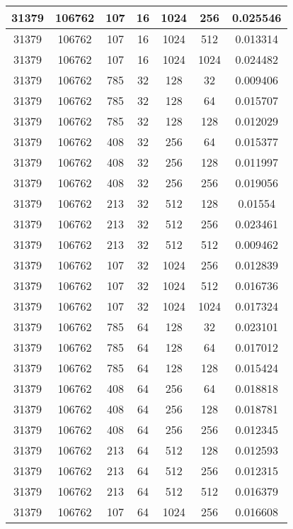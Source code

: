 \documentclass[9pt]{article}
\begin{document}
\begin{tabular}{|c|c|c|c|c|c|c| }
\hline
31379  & 106762  & 107  & 16  & 1024  & 256  & 0.025546 \\
\hline
31379  & 106762  & 107  & 16  & 1024  & 512  & 0.013314 \\
\hline
31379  & 106762  & 107  & 16  & 1024  & 1024  & 0.024482 \\
\hline
31379  & 106762  & 785  & 32  & 128  & 32  & 0.009406 \\
\hline
31379  & 106762  & 785  & 32  & 128  & 64  & 0.015707 \\
\hline
31379  & 106762  & 785  & 32  & 128  & 128  & 0.012029 \\
\hline
31379  & 106762  & 408  & 32  & 256  & 64  & 0.015377 \\
\hline
31379  & 106762  & 408  & 32  & 256  & 128  & 0.011997 \\
\hline
31379  & 106762  & 408  & 32  & 256  & 256  & 0.019056 \\
\hline
31379  & 106762  & 213  & 32  & 512  & 128  & 0.01554 \\
\hline
31379  & 106762  & 213  & 32  & 512  & 256  & 0.023461 \\
\hline
31379  & 106762  & 213  & 32  & 512  & 512  & 0.009462 \\
\hline
31379  & 106762  & 107  & 32  & 1024  & 256  & 0.012839 \\
\hline
31379  & 106762  & 107  & 32  & 1024  & 512  & 0.016736 \\
\hline
31379  & 106762  & 107  & 32  & 1024  & 1024  & 0.017324 \\
\hline
31379  & 106762  & 785  & 64  & 128  & 32  & 0.023101 \\
\hline
31379  & 106762  & 785  & 64  & 128  & 64  & 0.017012 \\
\hline
31379  & 106762  & 785  & 64  & 128  & 128  & 0.015424 \\
\hline
31379  & 106762  & 408  & 64  & 256  & 64  & 0.018818 \\
\hline
31379  & 106762  & 408  & 64  & 256  & 128  & 0.018781 \\
\hline
31379  & 106762  & 408  & 64  & 256  & 256  & 0.012345 \\
\hline
31379  & 106762  & 213  & 64  & 512  & 128  & 0.012593 \\
\hline
31379  & 106762  & 213  & 64  & 512  & 256  & 0.012315 \\
\hline
31379  & 106762  & 213  & 64  & 512  & 512  & 0.016379 \\
\hline
31379  & 106762  & 107  & 64  & 1024  & 256  & 0.016608 \\

\end{tabular}
\end{document}
